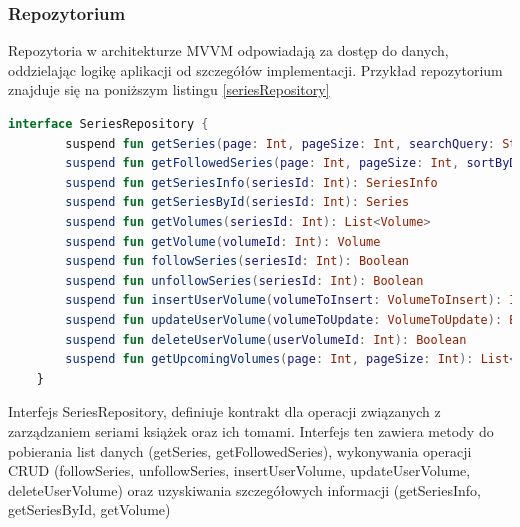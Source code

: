 \documentclass[12pt,twoside]{article}
\begin{document}
\subsubsection{Repozytorium}

Repozytoria w architekturze MVVM odpowiadają za dostęp do danych, oddzielając logikę aplikacji od szczegółów 
implementacji. Przykład repozytorium znajduje się na poniższym listingu \ref{seriesRepository}

\begin{lstlisting}[language=Kotlin,caption=Interfejs SeriesRepository, label={seriesRepository}]
	interface SeriesRepository {
		suspend fun getSeries(page: Int, pageSize: Int, searchQuery: String): List<Series>
		suspend fun getFollowedSeries(page: Int, pageSize: Int, sortByDate: Boolean, showFinished: Boolean): List<FollowedSeries>
		suspend fun getSeriesInfo(seriesId: Int): SeriesInfo
		suspend fun getSeriesById(seriesId: Int): Series
		suspend fun getVolumes(seriesId: Int): List<Volume>
		suspend fun getVolume(volumeId: Int): Volume
		suspend fun followSeries(seriesId: Int): Boolean
		suspend fun unfollowSeries(seriesId: Int): Boolean
		suspend fun insertUserVolume(volumeToInsert: VolumeToInsert): Int?
		suspend fun updateUserVolume(volumeToUpdate: VolumeToUpdate): Boolean
		suspend fun deleteUserVolume(userVolumeId: Int): Boolean
		suspend fun getUpcomingVolumes(page: Int, pageSize: Int): List<UpcomingVolume>
	}
\end{lstlisting}
Interfejs SeriesRepository, definiuje kontrakt dla operacji związanych z zarządzaniem seriami książek oraz ich 
tomami. Interfejs ten zawiera metody do pobierania list danych (getSeries, getFollowedSeries), wykonywania operacji 
CRUD (followSeries, unfollowSeries, insertUserVolume, updateUserVolume, deleteUserVolume) oraz uzyskiwania 
szczegółowych informacji (getSeriesInfo, getSeriesById, getVolume)
\end{document}
